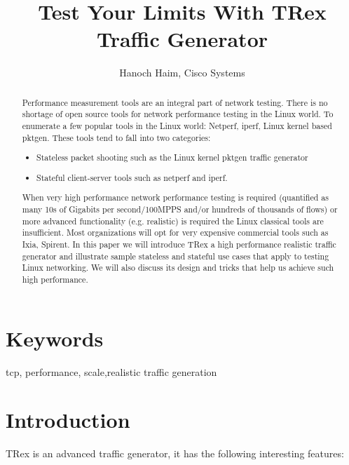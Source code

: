 \documentclass[letterpaper]{article}
\title{Test Your Limits With TRex Traffic Generator}
\author{Hanoch Haim, 
Cisco Systems \\
\newline
\newline
}
\begin{document}
 
\maketitle
\begin{abstract}
Performance measurement tools are an integral part of network testing. 
There is no shortage of open source tools for network performance
testing in the Linux world. 
To enumerate a few popular tools in the Linux world: Netperf, iperf, Linux kernel based pktgen.
These tools tend to fall into two categories:
\begin{itemize}
\item Stateless packet shooting such as the Linux kernel pktgen traffic generator 
\item Stateful client-server tools such as netperf and iperf. 
\end{itemize}  
When very high performance network performance testing is required (quantified as
many 10s of Gigabits per second/100MPPS and/or hundreds of thousands of flows) or more advanced functionality (e.g. realistic) is required the
Linux classical tools are insufficient. Most organizations
will opt for very expensive commercial tools such as Ixia, Spirent. 
In this paper we will introduce TRex a high performance realistic traffic generator
and illustrate sample stateless and stateful use cases that apply to testing
Linux networking. We will also discuss its design and tricks that help us
achieve such high performance.
\end{abstract}
    
\section{Keywords}

tcp, performance, scale,realistic traffic generation 

\section{Introduction}

TRex \cite{b1} is an advanced traffic generator, it has the following interesting features:
\end{document}

